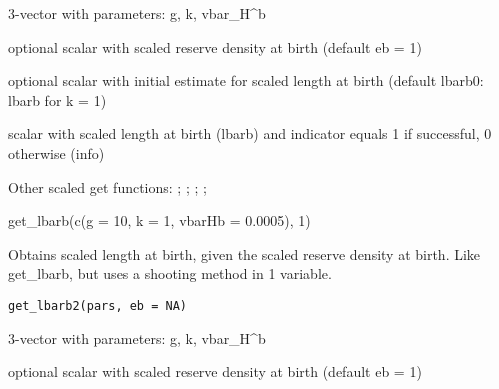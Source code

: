 \documentclass[a4paper]{book}
\begin{document}
%
\begin{Arguments}
\begin{ldescription}
\item[\code{pars}] 3-vector with parameters: g, k, vbar\_H\textasciicircum{}b

\item[\code{eb}] optional scalar with scaled reserve density at birth (default eb = 1)

\item[\code{lbarb0}] optional scalar with initial estimate for scaled length at birth (default lbarb0: lbarb for k = 1)
\end{ldescription}
\end{Arguments}
%
\begin{Value}
scalar with scaled length at birth (lbarb) and indicator equals 1 if successful, 0 otherwise (info)
\end{Value}
%
\begin{SeeAlso}\relax
Other scaled get functions: ;
; ;
;
\end{SeeAlso}
%
\begin{Examples}
\begin{ExampleCode}
get_lbarb(c(g = 10, k = 1, vbarHb = 0.0005), 1)
\end{ExampleCode}
\end{Examples}
%
\begin{Description}\relax
Obtains scaled length at birth, given the scaled reserve density at birth. Like get\_lbarb, but uses a shooting method in 1 variable.
\end{Description}
%
\begin{Usage}
\begin{verbatim}
get_lbarb2(pars, eb = NA)
\end{verbatim}
\end{Usage}
%
\begin{Arguments}
\begin{ldescription}
\item[\code{pars}] 3-vector with parameters: g, k, vbar\_H\textasciicircum{}b

\item[\code{eb}] optional scalar with scaled reserve density at birth (default eb = 1)
\end{ldescription}
\end{Arguments}
\end{document}
